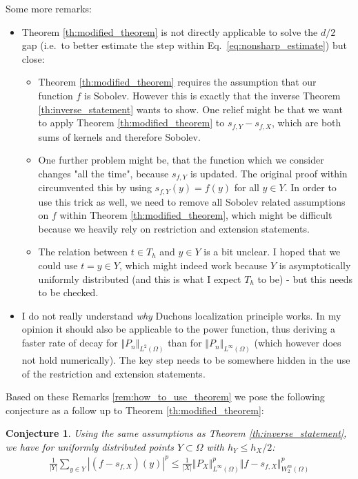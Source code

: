 \documentclass[a4paper, 10pt]{article}
\newtheorem{conj}{Conjecture}
\begin{document}
\begin{rem}
\label{rem:how_to_use_theorem}
Some more remarks:
\begin{itemize}
\item Theorem \ref{th:modified_theorem} is not directly applicable to solve the $d/2$ gap (i.e.\ to better estimate the step within Eq.\ \eqref{eq:nonsharp_estimate}) but close:
\begin{itemize}
\item Theorem \ref{th:modified_theorem} requires the assumption that our function $f$ is Sobolev. 
However this is exactly that the inverse Theorem \ref{th:inverse_statement} wants to show.
One relief might be that we want to apply Theorem \ref{th:modified_theorem} to $s_{f,Y} - s_{f,X}$, which are both sums of kernels and therefore Sobolev.
\item One further problem might be, that the function which we consider changes "all the time", because $s_{f,Y}$ is updated.
The original proof within \cite{wendland1997sobolev} circumvented this by using $s_{f, Y}(y) = f(y)$ for all $y \in Y$.
In order to use this trick as well, we need to remove all Sobolev related assumptions on $f$ within Theorem \ref{th:modified_theorem}, which might be difficult because we heavily rely on restriction and extension statements.
\item The relation between $t \in T_h$ and $y \in Y$ is a bit unclear.
I hoped that we could use $t = y \in Y$, which might indeed work because $Y$ is asymptotically uniformly distributed (and this is what I expect $T_h$ to be) - but this needs to be checked.
\end{itemize}
\item I do not really understand \textit{why} Duchons localization principle works.
In my opinion it should also be applicable to the power function, thus deriving a faster rate of decay for $\Vert P_n \Vert_{L^2(\Omega)}$ than for $\Vert P_n \Vert_{L^\infty(\Omega)}$ (which however does not hold numerically).
The key step needs to be somewhere hidden in the use of the restriction and extension statements.
\end{itemize}
\end{rem}

\noindent Based on these Remarks \ref{rem:how_to_use_theorem} we pose the following conjecture as a follow up to Theorem \ref{th:modified_theorem}:

\begin{conj}
\label{conj:conjecture1}
Using the same assumptions as Theorem \ref{th:inverse_statement}, we have for uniformly distributed points $Y \subset \Omega$ with $h_Y \leq h_X / 2$:
\begin{align}
\label{eq:conjectured_eq}
\frac{1}{|Y|} \sum_{y \in Y} | (f-s_{f,X})(y)|^p \leq \frac{1}{|X|} \Vert P_{X} \Vert_{L^\infty(\Omega)}^p \Vert f - s_{f, X} \Vert_{W_2^m(\Omega)}^p
\end{align}
\end{conj}
\end{document}
